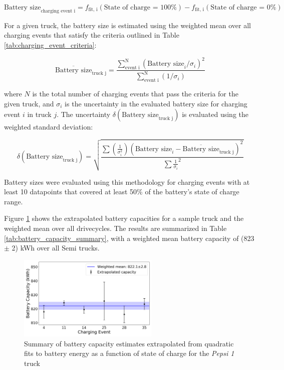 \begin{equation}
    \text{Battery size}_\text{charging event i} = f_\text{fit, i}(\text{State of charge = 100\%}) - f_\text{fit, i}(\text{State of charge = 0\%})
\end{equation}

For a given truck, the battery size is estimated using the weighted mean over all charging events that satisfy the criteria outlined in Table \ref{tab:charging_event_criteria}:

\begin{equation}
    \overline{\text{Battery size}}_\text{truck j} = \frac{\sum_\text{event i}^\text{N} (\text{Battery size}_i/\sigma_i)^2}{\sum_\text{event i}^\text{N}(1/\sigma_i)}
\end{equation}

where $N$ is the total number of charging events that pass the criteria for the given truck, and $\sigma_i$ is the uncertainty in the evaluated battery size for charging event $i$ in truck $j$. The uncertainty $\delta(\text{Battery size}_\text{truck j})$ is evaluated using the weighted standard deviation:

\begin{equation}
    \delta(\text{Battery size}_\text{truck j}) = \sqrt{\frac{\sum (\frac{1}{\sigma_i^2}) (\text{Battery size}_i - \overline{\text{Battery size}}_\text{truck j})^2}{\sum \frac{1}{\sigma_i}^2}}
\end{equation}

Battery sizes were evaluated using this methodology for charging events with at least 10 datapoints that covered at least 50\% of the battery's state of charge range.

Figure \ref{fig:battery_capacity_summary} shows the extrapolated battery capacities for a sample truck and the weighted mean over all drivecycles. The results are summarized in Table \ref{tab:battery_capacity_summary}, with a weighted mean battery capacity of (823 $\pm$ 2) kWh over all Semi trucks.

\begin{figure}[ht]
        \centering
        \includegraphics[width=0.6\textwidth]{figures/pepsi_1_battery_capacity_summary.png}
        \caption{Summary of battery capacity estimates extrapolated from quadratic fits to battery energy as a function of state of charge for the \textit{Pepsi 1} truck}
        \label{fig:battery_capacity_summary}
\end{figure}

